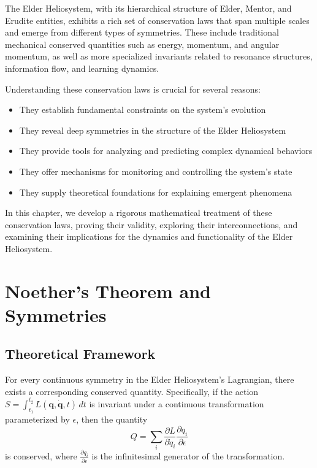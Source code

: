 The Elder Heliosystem, with its hierarchical structure of Elder, Mentor, and Erudite entities, exhibits a rich set of conservation laws that span multiple scales and emerge from different types of symmetries. These include traditional mechanical conserved quantities such as energy, momentum, and angular momentum, as well as more specialized invariants related to resonance structures, information flow, and learning dynamics.

Understanding these conservation laws is crucial for several reasons:

\begin{itemize}
    \item They establish fundamental constraints on the system's evolution
    \item They reveal deep symmetries in the structure of the Elder Heliosystem
    \item They provide tools for analyzing and predicting complex dynamical behaviors
    \item They offer mechanisms for monitoring and controlling the system's state
    \item They supply theoretical foundations for explaining emergent phenomena
\end{itemize}

In this chapter, we develop a rigorous mathematical treatment of these conservation laws, proving their validity, exploring their interconnections, and examining their implications for the dynamics and functionality of the Elder Heliosystem.

\section{Noether's Theorem and Symmetries}

\subsection{Theoretical Framework}

\begin{theorem}
For every continuous symmetry in the Elder Heliosystem's Lagrangian, there exists a corresponding conserved quantity. Specifically, if the action $S = \int_{t_1}^{t_2} L(\mathbf{q}, \dot{\mathbf{q}}, t) \, dt$ is invariant under a continuous transformation parameterized by $\epsilon$, then the quantity
\begin{equation}
Q = \sum_i \frac{\partial L}{\partial \dot{q}_i} \frac{\partial q_i}{\partial \epsilon}
\end{equation}
is conserved, where $\frac{\partial q_i}{\partial \epsilon}$ is the infinitesimal generator of the transformation.
\end{theorem}


